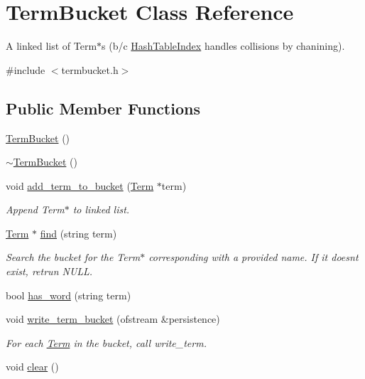 \hypertarget{class_term_bucket}{}\section{Term\+Bucket Class Reference}
\label{class_term_bucket}


A linked list of Term$\ast$s (b/c \hyperlink{class_hash_table_index}{Hash\+Table\+Index} handles collisions by chanining).  




{\ttfamily \#include $<$termbucket.\+h$>$}

\subsection*{Public Member Functions}
\begin{DoxyCompactItemize}
\item 
\hyperlink{class_term_bucket_a2f45be1b657541ccf0d255b5a4a4b6e7}{Term\+Bucket} ()
\item 
\hyperlink{class_term_bucket_a2995af64e66038cce2604cd26f27b743}{$\sim$\+Term\+Bucket} ()
\item 
void \hyperlink{class_term_bucket_ad8bccbf5570ca903ec3b5b7e6d90da83}{add\+\_\+term\+\_\+to\+\_\+bucket} (\hyperlink{class_term}{Term} $\ast$term)
\begin{DoxyCompactList}\small\item\em Append Term$\ast$ to linked list. \end{DoxyCompactList}\item 
\hyperlink{class_term}{Term} $\ast$ \hyperlink{class_term_bucket_a637756154b34dce701969c0e930a0de5}{find} (string term)
\begin{DoxyCompactList}\small\item\em Search the bucket for the Term$\ast$ corresponding with a provided name. If it doesn\textquotesingle{}t exist, retrun N\+U\+L\+L. \end{DoxyCompactList}\item 
bool \hyperlink{class_term_bucket_aa5f0d336448063bea5d33a090ac09785}{has\+\_\+word} (string term)
\item 
void \hyperlink{class_term_bucket_a9f861191a65c27611a4b15773b379716}{write\+\_\+term\+\_\+bucket} (ofstream \&persistence)
\begin{DoxyCompactList}\small\item\em For each \hyperlink{class_term}{Term} in the bucket, call write\+\_\+term. \end{DoxyCompactList}\item 
void \hyperlink{class_term_bucket_a8aa95625bf111166efd958f34e0da1e2}{clear} ()
\end{DoxyCompactItemize}



